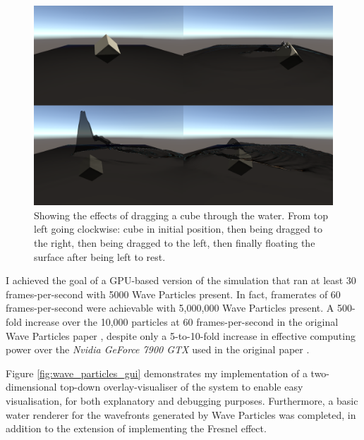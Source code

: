 \documentclass[12pt,a4paper,twoside]{report}
\begin{document}
\begin{figure}[h]
\centering
\includegraphics[width=0.8\linewidth]{cube_drag_all}
\caption{Showing the effects of dragging a cube through the water. From top
left going clockwise: cube in initial position, then being dragged to the
right, then being dragged to the left, then finally floating the surface after
being left to rest.}
\label{fig:cube_drag_1}
\end{figure}

I achieved the goal of a GPU-based version of the simulation that ran at least
30 frames-per-second with 5000 Wave Particles present. In fact, framerates of
60 frames-per-second were achievable with 5,000,000 Wave Particles present. A
500-fold increase over the 10,000 particles at 60 frames-per-second in the
original Wave Particles paper \cite{Yuksel2007}, despite only a 5-to-10-fold
increase in effective computing power over the \textit{Nvidia GeForce 7900 GTX}
used in the original paper \cite{GPUComparison}.

Figure \ref{fig:wave_particles_gui} demonstrates my implementation of a
two-dimensional top-down overlay-visualiser of the system to enable easy
visualisation, for both explanatory and debugging purposes. Furthermore, a
basic water renderer for the wavefronts generated by Wave Particles was
completed, in addition to the extension of implementing the Fresnel effect.

\end{document}
